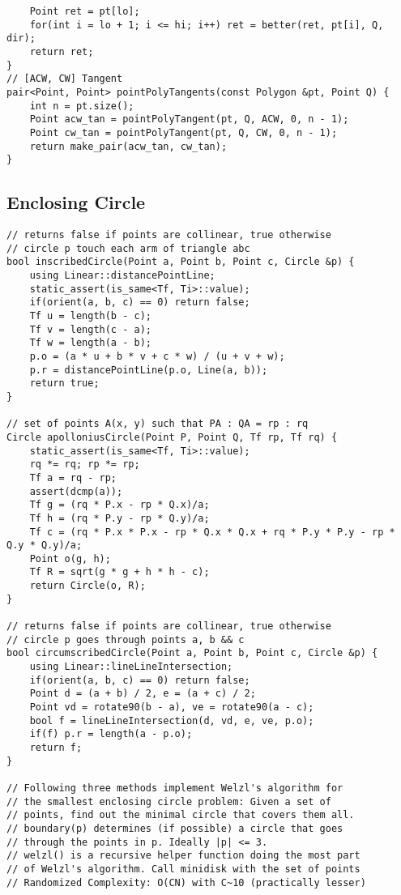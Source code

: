\documentclass[FSZ,a4paper,onesided]{article}
\begin{document}
\begin{multicols*}{\COLS}
\begin{lstlisting}
    Point ret = pt[lo];
    for(int i = lo + 1; i <= hi; i++) ret = better(ret, pt[i], Q, dir);
    return ret;
}
// [ACW, CW] Tangent
pair<Point, Point> pointPolyTangents(const Polygon &pt, Point Q) {
    int n = pt.size();
    Point acw_tan = pointPolyTangent(pt, Q, ACW, 0, n - 1);
    Point cw_tan = pointPolyTangent(pt, Q, CW, 0, n - 1);
    return make_pair(acw_tan, cw_tan);
}\end{lstlisting}
\subsection{Enclosing Circle}
\begin{lstlisting}
// returns false if points are collinear, true otherwise
// circle p touch each arm of triangle abc
bool inscribedCircle(Point a, Point b, Point c, Circle &p) {
    using Linear::distancePointLine;
    static_assert(is_same<Tf, Ti>::value);
    if(orient(a, b, c) == 0) return false;
    Tf u = length(b - c);
    Tf v = length(c - a);
    Tf w = length(a - b);
    p.o = (a * u + b * v + c * w) / (u + v + w);
    p.r = distancePointLine(p.o, Line(a, b));
    return true;
}

// set of points A(x, y) such that PA : QA = rp : rq
Circle apolloniusCircle(Point P, Point Q, Tf rp, Tf rq) {
    static_assert(is_same<Tf, Ti>::value);
    rq *= rq; rp *= rp;
    Tf a = rq - rp;
    assert(dcmp(a));
    Tf g = (rq * P.x - rp * Q.x)/a;
    Tf h = (rq * P.y - rp * Q.y)/a;
    Tf c = (rq * P.x * P.x - rp * Q.x * Q.x + rq * P.y * P.y - rp * Q.y * Q.y)/a;
    Point o(g, h);
    Tf R = sqrt(g * g + h * h - c);
    return Circle(o, R);
}

// returns false if points are collinear, true otherwise
// circle p goes through points a, b && c
bool circumscribedCircle(Point a, Point b, Point c, Circle &p) {
    using Linear::lineLineIntersection;
    if(orient(a, b, c) == 0) return false;
    Point d = (a + b) / 2, e = (a + c) / 2;
    Point vd = rotate90(b - a), ve = rotate90(a - c);
    bool f = lineLineIntersection(d, vd, e, ve, p.o);
    if(f) p.r = length(a - p.o);
    return f;
}

// Following three methods implement Welzl's algorithm for
// the smallest enclosing circle problem: Given a set of
// points, find out the minimal circle that covers them all.
// boundary(p) determines (if possible) a circle that goes
// through the points in p. Ideally |p| <= 3.
// welzl() is a recursive helper function doing the most part
// of Welzl's algorithm. Call minidisk with the set of points
// Randomized Complexity: O(CN) with C~10 (practically lesser)


\end{lstlisting}
\end{multicols*}
\end{document}
